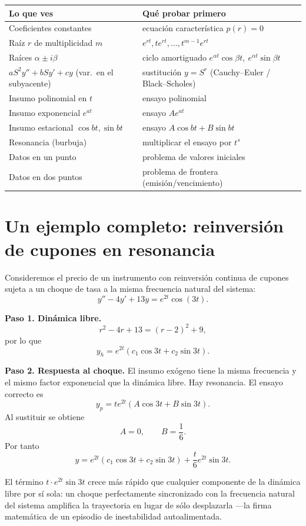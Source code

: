 \documentclass[11pt]{article}
\theoremstyle{definition}
\begin{document}
\begin{center}
\begin{tabular}{>{\raggedright}p{}p{}}
\toprule
\rowcolor{upgold!15}
\textbf{Lo que ves} & \textbf{Qué probar primero}\\
\midrule
Coeficientes constantes & ecuación característica $p(r)=0$\\
Raíz $r$ de multiplicidad $m$ & $e^{rt},te^{rt},\ldots,t^{m-1}e^{rt}$\\
Raíces $\alpha\pm i\beta$ & ciclo amortiguado $e^{\alpha t}\cos\beta t,\ e^{\alpha t}\sin\beta t$\\
$aS^2y''+bSy'+cy$ (var.\ en el subyacente) & sustitución $y=S^r$ (Cauchy--Euler / Black--Scholes)\\
Insumo polinomial en $t$ & ensayo polinomial\\
Insumo exponencial $e^{at}$ & ensayo $Ae^{at}$\\
Insumo estacional $\cos bt,\sin bt$ & ensayo $A\cos bt+B\sin bt$\\
Resonancia (burbuja) & multiplicar el ensayo por $t^s$\\
Datos en un punto & problema de valores iniciales\\
Datos en dos puntos & problema de frontera (emisión/vencimiento)\\
\bottomrule
\end{tabular}
\end{center}

\section{Un ejemplo completo: reinversión de cupones en resonancia}

Consideremos el precio de un instrumento con reinversión continua de cupones sujeta a
un choque de tasa a la misma frecuencia natural del sistema:
\[
y''-4y'+13y=e^{2t}\cos(3t).
\]

\textbf{Paso 1. Dinámica libre.}
\[
r^2-4r+13=(r-2)^2+9,
\]
por lo que
\[
y_h=e^{2t}(c_1\cos3t+c_2\sin3t).
\]

\textbf{Paso 2. Respuesta al choque.}
El insumo exógeno tiene la misma frecuencia y el mismo factor exponencial que la
dinámica libre. Hay resonancia. El ensayo correcto es
\[
y_p=te^{2t}(A\cos3t+B\sin3t).
\]
Al sustituir se obtiene
\[
A=0,\qquad B=\frac16.
\]
Por tanto
\[
\boxed{
y=e^{2t}(c_1\cos3t+c_2\sin3t)
+\frac{t}{6}e^{2t}\sin3t}.
\]

\begin{finanzas}
El término $t\cdot e^{2t}\sin3t$ crece más rápido que cualquier componente de la
dinámica libre por sí sola: un choque perfectamente sincronizado con la frecuencia
natural del sistema amplifica la trayectoria en lugar de sólo desplazarla —la firma
matemática de un episodio de inestabilidad autoalimentada.
\end{finanzas}
\end{document}
